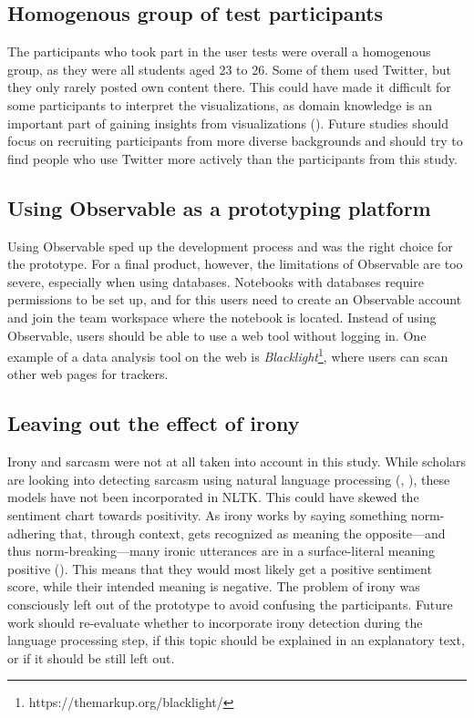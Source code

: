 \subsection*{Homogenous group of test participants}
The participants who took part in the user tests were overall a homogenous group, as they were all students aged 23 to 26. Some of them used Twitter, but they only rarely posted own content there. This could have made it difficult for some participants to interpret the visualizations, as domain knowledge is an important part of gaining insights from visualizations (\cite{northMeasuringVisualizationInsight2006}). Future studies should focus on recruiting participants from more diverse backgrounds and should try to find people who use Twitter more actively than the participants from this study.

\subsection*{Using Observable as a prototyping platform}
Using Observable sped up the development process and was the right choice for the prototype. For a final product, however, the limitations of Observable are too severe, especially when using databases. Notebooks with databases require permissions to be set up, and for this users need to create an Observable account and join the team workspace where the notebook is located. Instead of using Observable, users should be able to use a web tool without logging in. One example of a data analysis tool on the web is \emph{Blacklight}\footnote{https://themarkup.org/blacklight/}, where users can scan other web pages for trackers.

\subsection*{Leaving out the effect of irony}
Irony and sarcasm were not at all taken into account in this study. While scholars are looking into detecting sarcasm using natural language processing (\cite{reyesMultidimensionalApproachDetecting2013}, \cite{barbieriModellingIronyTwitter2014}), these models have not been incorporated in NLTK. This could have skewed the sentiment chart towards positivity. As irony works by saying something norm-adhering that, through context, gets recognized as meaning the opposite---and thus norm-breaking---many ironic utterances are in a surface-literal meaning positive (\cite{gioraIronyNegation1995}). This means that they would most likely get a positive sentiment score, while their intended meaning is negative. The problem of irony was consciously left out of the prototype to avoid confusing the participants. Future work should re-evaluate whether to incorporate irony detection during the language processing step, if this topic should be explained in an explanatory text, or if it should be still left out.
